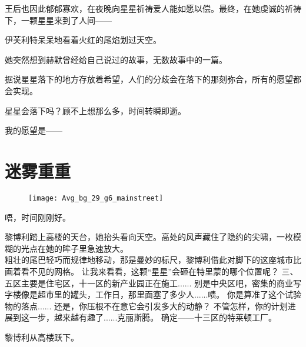\documentclass[openany]{book}
\begin{document}
王后也因此郁郁寡欢，在夜晚向星星祈祷爱人能如愿以偿。最终，在她虔诚的祈祷下，一颗星星来到了人间——\par
伊芙利特呆呆地看着火红的尾焰划过天空。\par
她突然想到赫默曾经给自己说过的故事，无数故事中的一篇。\par
据说星星落下的地方存放着希望，人们的分歧会在落下的那刻弥合，所有的愿望都会实现。\par
星星会落下吗？顾不上想那么多，时间转瞬即逝。\par
\clearpage
{}
\begin{center}
    \begin{minipage}{.6\textwidth}
        \begin{center}
            我的愿望是——
        \end{center}
    \end{minipage}
\end{center}


\chapter{迷雾重重}

\begin{figure}[h]
    \centering
    \texttt{[image: Avg\_bg\_29\_g6\_mainstreet]}
\end{figure}
\begin{dialogue}
     唔，时间刚刚好。\par
    黎博利踏上高楼的天台，她抬头看向天空。高处的风声藏住了隐约的尖啸，一枚模糊的光点在她的眸子里急速放大。\\
    粗壮的尾巴轻巧而规律地移动，那是曼妙的标尺，黎博利借此对脚下的这座城市比画着看不见的网格。
     让我来看看，这颗“星星”会砸在特里蒙的哪个位置呢？
     三、五区主要是住宅区，十一区的新产业园正在施工......
     别是中央区吧，密集的商业写字楼像是超市里的罐头，工作日，那里面塞了多少人......啧。
     你是算准了这个试验物的落点......
     还是，你压根不在意它会引发多大的动静？
     不管怎样，你的计划进展到这一步，越来越有趣了......克丽斯腾。
     确定——十三区的特莱顿工厂。
\end{dialogue}
\par
黎博利从高楼跃下。
\end{document}
